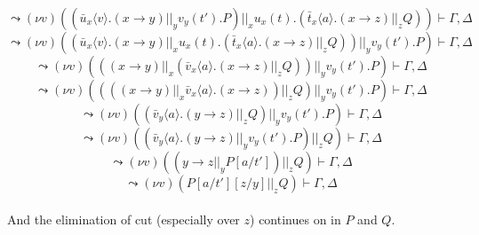 \documentclass[a4paper,12pt]{article}
\begin{document}
\[\leadsto (\nu v)((\bar{u}_x\langle v\rangle.(x\to y) ||_y v_y(t').P) ||_x u_x(t).(\bar{t}_x\langle a\rangle.(x\to z) ||_z Q)) \vdash \Gamma,\Delta\]
\[\leadsto (\nu v)((\bar{u}_x\langle v\rangle.(x\to y) ||_x u_x(t).(\bar{t}_x\langle a\rangle.(x\to z) ||_z Q)) ||_y v_y(t').P) \vdash \Gamma,\Delta\]
\[\leadsto (\nu v)(((x\to y) ||_x (\bar{v}_x\langle a\rangle.(x\to z) ||_z Q)) ||_y v_y(t').P) \vdash \Gamma,\Delta\]
\[\leadsto (\nu v)((((x\to y) ||_x \bar{v}_x\langle a\rangle.(x\to z)) ||_z Q) ||_y v_y(t').P) \vdash \Gamma,\Delta\]
\[\leadsto (\nu v)((\bar{v}_y\langle a\rangle.(y\to z) ||_z Q) ||_y v_y(t').P) \vdash \Gamma,\Delta\]
\[\leadsto (\nu v)((\bar{v}_y\langle a\rangle.(y\to z) ||_y v_y(t').P) ||_z Q) \vdash \Gamma,\Delta\]
\[\leadsto (\nu v)((y\to z ||_y P[a/t']) ||_z Q) \vdash \Gamma,\Delta\]
\[\leadsto (\nu v)(P[a/t'][z/y] ||_z Q) \vdash \Gamma,\Delta\]~\\
And the elimination of cut (especially over $z$) continues on in $P$ and $Q$.
\end{document}
